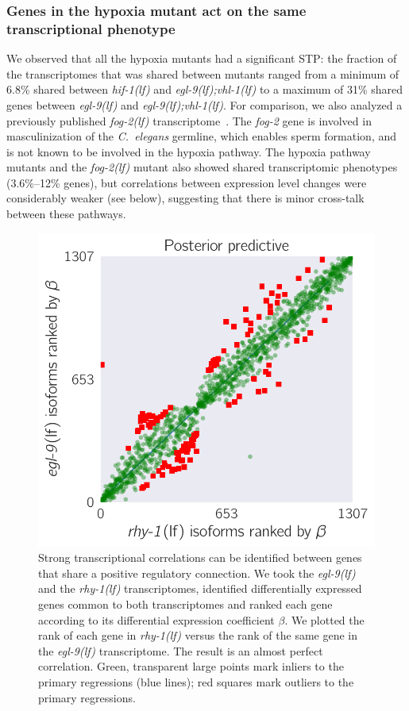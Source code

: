 \documentclass[10pt, onecolumn]{article}
\newcommand{\cel}{\emph{C.~elegans}}
\newcommand{\gene}[1]{\emph{#1}}
\newcommand{\fog}{\emph{\mbox{fog-2(lf)}}}
\newcommand{\egl}{\emph{\mbox{egl-9}(lf)}}
\newcommand{\rhy}{\emph{\mbox{rhy-1}(lf)}}
\newcommand{\eglvhl}{\emph{\mbox{egl-9(lf);vhl-1(lf)}}}
\newcommand{\hif}{\emph{\mbox{hif-1(lf)}}}
\begin{document}
\subsubsection*{Genes in the hypoxia mutant act on the same transcriptional phenotype}
\label{sec:phenotypes}
We observed that all the hypoxia mutants had a significant STP: the fraction of
the transcriptomes that was shared between mutants
ranged from a minimum of 6.8\% shared between \hif{} and \eglvhl{} to a maximum
of 31\% shared genes between \egl{} and \eglvhl{}. For comparison, we also
analyzed a previously published \fog{} transcriptome~\cite{Angeles-Albores2016a}.
The \gene{fog-2} gene is involved in masculinization of the \cel{} germline,
which enables sperm formation, and is not known to be involved in the hypoxia
pathway. The hypoxia pathway mutants and the \fog{} mutant also showed shared
transcriptomic phenotypes (3.6\%--12\% genes), but correlations between
expression level changes were considerably weaker (see below), suggesting that
there is minor cross-talk between these pathways.


\begin{figure}[tbhp]
\centering
\includegraphics[width=.4\linewidth]{../figs/multiplemodes-eb.pdf}
\caption{
Strong transcriptional correlations can be identified between genes
that share a positive regulatory connection. We took the \egl{} and the \rhy{}
transcriptomes, identified differentially expressed genes common to both
transcriptomes and ranked each gene according to its differential expression
coefficient $\beta$. We plotted the rank of each gene in \rhy{} versus the
rank of the same gene in the \egl{} transcriptome. The result is an almost
perfect correlation. Green, transparent large points mark inliers to the primary
regressions (blue lines); red squares mark outliers to the primary regressions.
}
\label{fig:genetic_interactions}
\end{figure}
\end{document}
